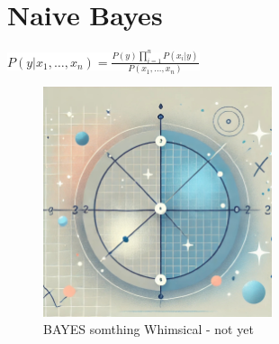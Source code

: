 \documentclass[
  12 pt,
  a4paper,
]{book}
\numberwithin{equation}{section}
\theoremstyle{plain}      %
\theoremstyle{definition} %
\theoremstyle{remark}     %
\theoremstyle{note}         %
\begin{document}
\newpage

\hypertarget{naive-bayes}{%
\chapter{Naive Bayes}\label{naive-bayes}}

\begin{center}
\colorbox{white}{\color{navyimpactblue} \huge $P(y | x_1, \ldots, x_n) = \frac{P(y) \prod_{i=1}^{n} P(x_i | y)}{P(x_1, \ldots, x_n)}$}
\end{center}

\hfill\break

\begin{figure}[h!]
  \begin{center}
    \includegraphics[width=0.6\textwidth]{pictures/Whimsical-6-cosine_similarity.jpeg}
    \caption*{\Large BAYES somthing Whimsical - not yet}
  \end{center}
\end{figure}

\newpage
\end{document}
